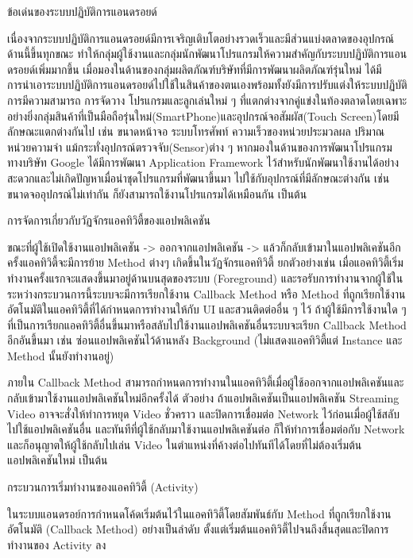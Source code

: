 	ข้อเด่นของระบบปฏิบัติการแอนดรอยด์

	เนื่องจากระบบปฏิบัติการแอนดรอยด์มีการเจริญเติบโตอย่างรวดเร็วและมีส่วนแบ่งตลาดของอุปกรณ์ด้านนี้ขึ้นทุกขณะ ทำให้กลุ่มผู้ใช้งานและกลุ่มนักพัฒนาโปรแกรมให้ความสำคัญกับระบบปฏิบัติการแอนดรอยด์เพิ่มมากขึ้น
	เมื่อมองในด้านของกลุ่มผลิตภัณฑ์บริษัทที่มีการพัฒนาผลิตภัณฑ์รุ่นใหม่ ได้มีการนำเอาระบบปฏิบัติการแอนดรอยด์ไปใช้ในสินค้าของตนเองพร้อมทั้งยังมีการปรับแต่งให้ระบบปฏิบัติการมีความสามารถ การจัดวาง โปรแกรมและลูกเล่นใหม่ ๆ ที่แตกต่างจากคู่แข่งในท้องตลาดโดยเฉพาะอย่างยิ่งกลุ่มสินค้าที่เป็นมือถือรุ่นใหม่(SmartPhone)และอุปกรณ์จอสัมผัส(Touch Screen)โดยมีลักษณะแตกต่างกันไป เช่น ขนาดหน้าจอ ระบบโทรศัพท์ ความเร็วของหน่วยประมวลผล ปริมาณหน่วยความจำ แม้กระทั่งอุปกรณ์ตรวจจับ(Sensor)ต่าง ๆ 
	หากมองในด้านของการพัฒนาโปรแกรม ทางบริษัท Google ได้มีการพัฒนา Application Framework ไว้สำหรับนักพัฒนาใช้งานได้อย่างสะดวกและไม่เกิดปัญหาเมื่อนำชุดโปรแกรมที่พัฒนาขึ้นมา ไปใช้กับอุปกรณ์ที่มีลักษณะต่างกัน เช่น ขนาดจออุปกรณ์ไม่เท่ากัน ก็ยังสามารถใช้งานโปรแกรมได้เหมือนกัน เป็นต้น

	การจัดการเกี่ยวกับวัฏจักรแอคทิวิตี้ของแอปพลิเคชัน
	
	ขณะที่ผู้ใช้เปิดใช้งานแอปพลิเคชัน -> ออกจากแอปพลิเคชัน -> แล้วก็กลับเข้ามาในแอปพลิเคชันอีกครั้งแอคทิวิตี้จะมีการย้าย Method ต่างๆ เกิดขึ้นในวัฏจักรแอคทิวิตี้ ยกตัวอย่างเช่น 
	เมื่อแอคทิวิตี้เริ่มทำงานครั้งแรกจะแสดงขึ้นมาอยู่ด้านบนสุดของระบบ (Foreground) และรอรับการทำงานจากผู้ใช้ในระหว่างกระบวนการนี้ระบบจะมีการเรียกใช้งาน Callback Method หรือ Method ที่ถูกเรียกใช้งานอัตโนมัติในแอคทิวิตี้ที่ได้กำหนดการทำงานให้กับ UI และสวนติดต่ออื่น ๆ ไว้ ถ้าผู้ใช้มีการใช้งานใด ๆ ที่เป็นการเรียกแอคทิวิตี้อื่นขึ้นมาหรือสลับไปใช้งานแอปพลิเคชันอื่นระบบจะเรียก Callback Method อีกอันขึ้นมา เช่น ซ่อนแอปพลิเคชันไว้ด้านหลัง Background (ไม่แสดงแอคทิวิตี้แต่ Instance และ Method นั้นยังทำงานอยู่)
	
	ภายใน Callback Method สามารถกำหนดการทำงานในแอคทิวิตี้เมื่อผู้ใช้ออกจากแอปพลิเคชันและกลับเข้ามาใช้งานแอปพลิเคชันใหม่อีกครั้งได้ ตัวอย่าง ถ้าแอปพลิเคชันเป็นแอปพลิเคชัน Streaming Video
	อาจจะสั่งให้ทำการหยุด Video ชั่วคราว และปิดการเชื่อมต่อ Network ไว้ก่อนเมื่อผู้ใช้สลับไปใช้แอปพลิเคชันอื่น
	และทันทีที่ผู้ใช้กลับมาใช้งานแอปพลิเคชันต่อ ก็ให้ทำการเชื่อมต่อกับ Network และก็อนุญาตให้ผู้ใช้กลับไปเล่น Video
	ในตำแหน่งที่ค้างต่อไปทันทีได้โดยที่ไม่ต้องเริ่มต้นแอปพลิเคชันใหม่ เป็นต้น
	
	กระบวนการเริ่มทำงานของแอคทิวิตี้ (Activity)
	
	
	ในระบบแอนดรอย์การกำหนดโค้ดเริ่มต้นไว้ในแอคทิวิตี้โดยสัมพันธ์กับ Method ที่ถูกเรียกใช้งานอัตโนมัติ (Callback Method) อย่างเป็นลำดับ ตั้งแต่เริ่มต้นแอคทิวิตี้ไปจนถึงสิ้นสุดและปิดการทำงานของ Activity ลง
	
